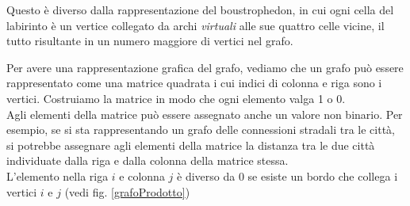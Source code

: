 \documentclass[8pt]{book}
\begin{document}
Questo è diverso dalla rappresentazione del boustrophedon, in cui ogni cella del labirinto è un vertice collegato da archi \emph{virtuali} alle sue quattro celle vicine, il tutto risultante in un numero maggiore di vertici nel grafo.

Per avere una rappresentazione grafica del grafo, vediamo che un grafo può essere rappresentato come una matrice quadrata i cui indici di colonna e riga sono i vertici. Costruiamo la matrice in modo che ogni elemento valga 1 o 0.\\

Agli elementi della matrice può essere assegnato anche un valore non binario. Per esempio, se si sta rappresentando un grafo delle connessioni stradali tra le città, si potrebbe assegnare agli elementi della matrice la distanza tra le due città individuate dalla riga e dalla colonna della matrice stessa.\\

L'elemento nella riga $i$ e colonna $j$ è diverso da 0 se esiste un bordo che collega i vertici $i$ e $j$ (vedi fig. \ref{grafoProdotto})
\end{document}
